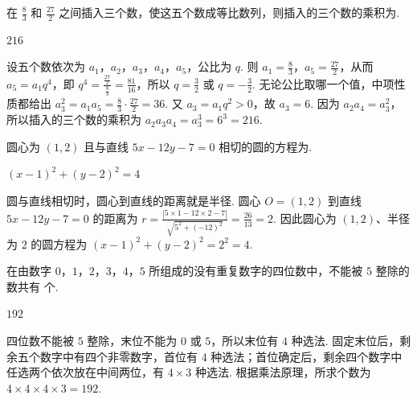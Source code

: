 \begin{problem}
在 \(\frac{8}{3}\) 和 \(\frac{27}{2}\) 之间插入三个数，使这五个数成等比数列，则插入的三个数的乘积为\fillinblank{}.
\end{problem}

\begin{answer}\(216\)\end{answer}

\begin{solution}
设五个数依次为 \(a_{1}\)，\(a_{2}\)，\(a_{3}\)，\(a_{4}\)，\(a_{5}\)，公比为 \(q\). 则 \(a_{1}=\frac83\)，\(a_{5}=\frac{27}{2}\)，从而 \(a_{5}=a_{1}q^{4}\)，即 \(q^{4}=\frac{\frac{27}{2}}{\frac{8}{3}}=\frac{81}{16}\)，所以 \(q=\frac32\) 或 \(q=-\frac32\). 无论公比取哪一个值，中项性质都给出 \(a_{3}^{2}=a_{1}a_{5}=\frac83\cdot\frac{27}{2}=36\). 又 \(a_{3}=a_{1}q^{2}>0\)，故 \(a_{3}=6\). 因为 \(a_{2}a_{4}=a_{3}^{2}\)，所以插入的三个数的乘积为 \(a_{2}a_{3}a_{4}=a_{3}^{3}=6^{3}=216\).
\end{solution}

\begin{problem}
圆心为 \((1,2)\) 且与直线 \(5x - 12y - 7 = 0\) 相切的圆的方程为\fillinblank{}.
\end{problem}

\begin{answer}\(\left(x-1\right)^{2}+\left(y-2\right)^{2}=4\)\end{answer}

\begin{solution}
圆与直线相切时，圆心到直线的距离就是半径. 圆心 \(O=(1,2)\) 到直线 \(5x-12y-7=0\) 的距离为 \(r=\frac{|5\times1-12\times2-7|}{\sqrt{5^{2}+(-12)^{2}}}=\frac{26}{13}=2\). 因此圆心为 \((1,2)\)、半径为 \(2\) 的圆方程为 \(\left(x-1\right)^{2}+\left(y-2\right)^{2}=2^{2}=4\).
\end{solution}

\begin{problem}
在由数字 \(0\)，\(1\)，\(2\)，\(3\)，\(4\)，\(5\) 所组成的没有重复数字的四位数中，不能被 \(5\) 整除的数共有\fillinblank{}\(\text{ 个}\).
\end{problem}

\begin{answer}\(192\)\end{answer}

\begin{solution}
四位数不能被 \(5\) 整除，末位不能为 \(0\) 或 \(5\)，所以末位有 \(4\) 种选法. 固定末位后，剩余五个数字中有四个非零数字，首位有 \(4\) 种选法；首位确定后，剩余四个数字中任选两个依次放在中间两位，有 \(4\times3\) 种选法. 根据乘法原理，所求个数为 \(4\times4\times4\times3=192\).
\end{solution}

